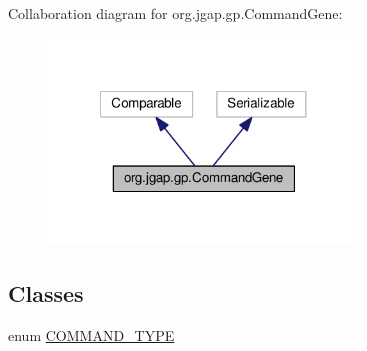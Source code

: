Collaboration diagram for org.\-jgap.\-gp.\-Command\-Gene\-:
\nopagebreak
\begin{figure}[H]
\begin{center}
\leavevmode
\includegraphics[width=233pt]{classorg_1_1jgap_1_1gp_1_1_command_gene__coll__graph}
\end{center}
\end{figure}
\subsection*{Classes}
\begin{DoxyCompactItemize}
\item 
enum \hyperlink{enumorg_1_1jgap_1_1gp_1_1_command_gene_1_1_c_o_m_m_a_n_d___t_y_p_e}{C\-O\-M\-M\-A\-N\-D\-\_\-\-T\-Y\-P\-E}
\end{DoxyCompactItemize}
